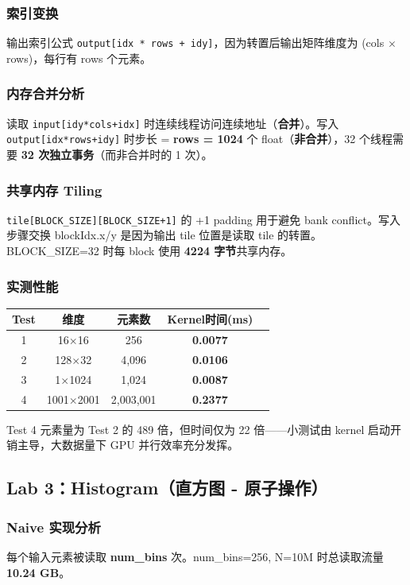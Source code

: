 \documentclass[12pt,a4paper]{article}
\newcommand{\ans}[1]{\textcolor{answerblue}{\textbf{#1}}}
\begin{document}
\subsubsection*{索引变换}
输出索引公式 \texttt{output[idx * rows + idy]}，因为转置后输出矩阵维度为 (cols $\times$ rows)，每行有 rows 个元素。

\subsubsection*{内存合并分析}
读取 \texttt{input[idy*cols+idx]} 时连续线程访问连续地址（\textbf{合并}）。写入 \texttt{output[idx*rows+idy]} 时步长 = \ans{rows = 1024} 个 float（\textbf{非合并}），32 个线程需要 \ans{32 次独立事务}（而非合并时的 1 次）。

\subsubsection*{共享内存 Tiling}
\texttt{tile[BLOCK\_SIZE][BLOCK\_SIZE+1]} 的 +1 padding 用于避免 bank conflict。写入步骤交换 blockIdx.x/y 是因为输出 tile 位置是读取 tile 的转置。BLOCK\_SIZE=32 时每 block 使用 \ans{4224 字节}共享内存。

\subsubsection*{实测性能}
\begin{table}[H]
\centering
\begin{tabular}{ccccc}
\toprule
Test & 维度 & 元素数 & Kernel时间(ms) \\
\midrule
1 & 16$\times$16   & 256       & \ans{0.0077} \\
2 & 128$\times$32  & 4,096     & \ans{0.0106} \\
3 & 1$\times$1024  & 1,024     & \ans{0.0087} \\
4 & 1001$\times$2001 & 2,003,001 & \ans{0.2377} \\
\bottomrule
\end{tabular}
\end{table}
Test 4 元素量为 Test 2 的 489 倍，但时间仅为 22 倍——小测试由 kernel 启动开销主导，大数据量下 GPU 并行效率充分发挥。

\subsection{Lab 3：Histogram（直方图 - 原子操作）}

\subsubsection*{Naive 实现分析}
每个输入元素被读取 \ans{num\_bins} 次。num\_bins=256, N=10M 时总读取流量 \ans{10.24 GB}。
\end{document}
